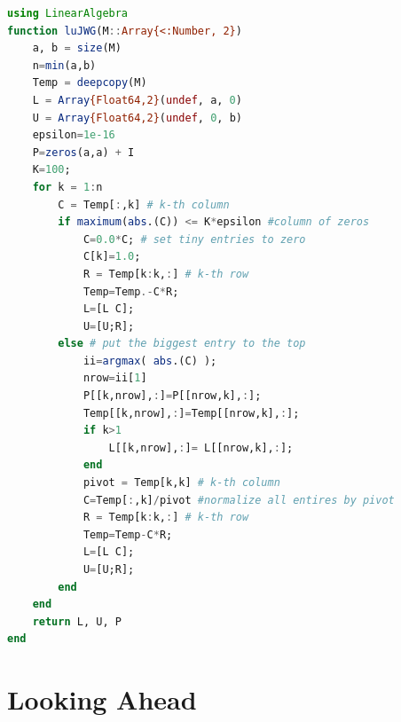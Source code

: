\begin{lstlisting}[language=Julia,style=mystyle]
using LinearAlgebra
function luJWG(M::Array{<:Number, 2})
    a, b = size(M)
    n=min(a,b)
    Temp = deepcopy(M)
    L = Array{Float64,2}(undef, a, 0)
    U = Array{Float64,2}(undef, 0, b)
    epsilon=1e-16
    P=zeros(a,a) + I
    K=100;      
    for k = 1:n
        C = Temp[:,k] # k-th column
        if maximum(abs.(C)) <= K*epsilon #column of zeros
            C=0.0*C; # set tiny entries to zero
            C[k]=1.0;
            R = Temp[k:k,:] # k-th row
            Temp=Temp.-C*R;
            L=[L C];
            U=[U;R]; 
        else # put the biggest entry to the top
            ii=argmax( abs.(C) );
            nrow=ii[1] 
            P[[k,nrow],:]=P[[nrow,k],:];
            Temp[[k,nrow],:]=Temp[[nrow,k],:];
            if k>1
                L[[k,nrow],:]= L[[nrow,k],:];
            end
            pivot = Temp[k,k] # k-th column
            C=Temp[:,k]/pivot #normalize all entires by pivot
            R = Temp[k:k,:] # k-th row
            Temp=Temp-C*R;
            L=[L C];
            U=[U;R];
        end
    end         
    return L, U, P
end
\end{lstlisting}   


\section{Looking Ahead}

